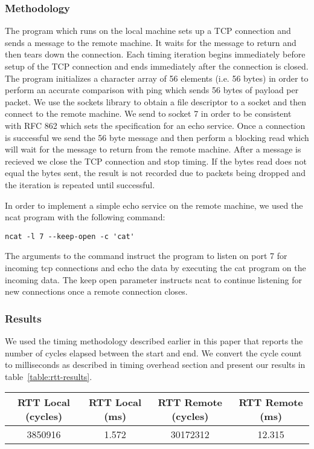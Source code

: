 \subsubsection{Methodology}

The program which runs on the local machine sets up a TCP connection and sends
a message to the remote machine. It waits for the message to return and then
tears down the connection. Each timing iteration begins immediately before
setup of the TCP connection and ends immediately after the connection is
closed. The program initializes a character array of 56 elements (i.e. 56
bytes) in order to perform an accurate comparison with ping which sends 56
bytes of payload per packet.  We use the sockets library to obtain a file
descriptor to a socket and then connect to the remote machine. We send to
socket 7 in order to be consistent with RFC 862 \cite{rfc862} which sets the
specification for an echo service. Once a connection is successful we send the
56 byte message and then perform a blocking read which will wait for the
message to return from the remote machine. After a message is recieved we close
the TCP connection and stop timing. If the bytes read does not equal the bytes
sent, the result is not recorded due to packets being dropped and the iteration
is repeated until successful.

In order to implement a simple echo service on the remote machine, we used the
ncat program with the following command: 
\begin{verbatim}
ncat -l 7 --keep-open -c 'cat'
\end{verbatim}
The arguments to the command instruct the program to listen on port 7 for
incoming tcp connections and echo the data by executing the cat program on the
incoming data. The keep open parameter instructs ncat to continue listening for
new connections once a remote connection closes.

\subsubsection{Results}

We used the timing methodology described earlier in this paper that reports the
number of cycles elapsed between the start and end. We convert the cycle count
to milliseconds as described in timing overhead section and present our results
in table~\ref{table:rtt-results}.

\begin{table*}[b]
\begin{tabular}{|c|c|c|c|}
\hline
RTT Local (cycles) & RTT Local (ms) & RTT Remote (cycles) & RTT Remote (ms) \\ \hline
3850916            & 1.572          & 30172312            & 12.315          \\ \hline
\end{tabular}
\caption{RTT experimental results}
\label{table:rtt-results}
\end{table*}

